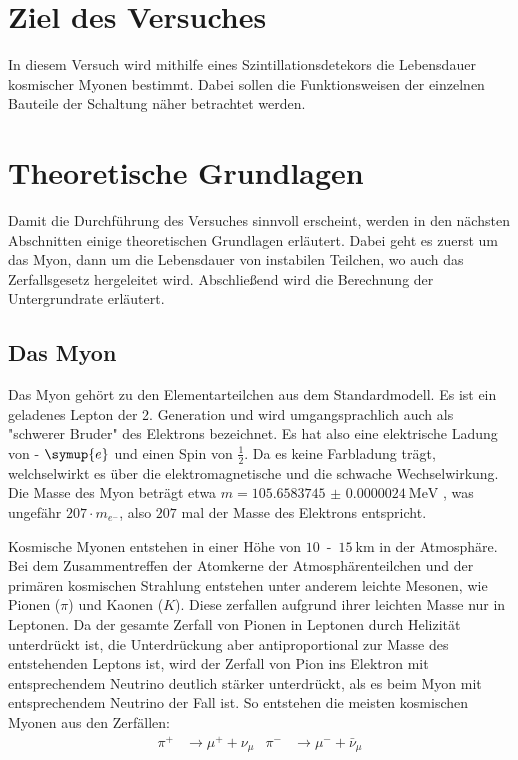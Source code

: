 \section{Ziel des Versuches}
\label{sec:ziel}

    \noindent In diesem Versuch wird mithilfe eines Szintillationsdetekors die Lebensdauer kosmischer Myonen bestimmt. 
    Dabei sollen die Funktionsweisen der einzelnen Bauteile der Schaltung näher betrachtet werden. 

\section{Theoretische Grundlagen}
\label{sec:Theorie}

    \noindent Damit die Durchführung des Versuches sinnvoll erscheint, werden in den nächsten Abschnitten einige theoretischen Grundlagen erläutert. 
    Dabei geht es zuerst um das Myon, dann um die Lebensdauer von instabilen Teilchen, wo auch das Zerfallsgesetz hergeleitet wird. Abschließend 
    wird die Berechnung der Untergrundrate erläutert. 

    \subsection{Das Myon}

        \noindent Das Myon gehört zu den Elementarteilchen aus dem Standardmodell. Es ist ein geladenes Lepton der 2. Generation und wird umgangsprachlich 
        auch als "schwerer Bruder" des Elektrons bezeichnet. Es hat also eine elektrische Ladung von - $\symup{e}$ und einen Spin von $\frac{1}{2}$. Da es keine 
        Farbladung trägt, welchselwirkt es über die elektromagnetische und die schwache Wechselwirkung. Die Masse des Myon beträgt etwa $m = \SI{105.6583745(24)}{\mega\electronvolt}$ 
        \cite{pdg}, was ungefähr $207 \cdot m_{e^-}$, also $207$ mal der Masse des Elektrons entspricht.   

        \noindent Kosmische Myonen entstehen in einer Höhe von $\num{10}$\, -\, $\SI{15}{\kilo\metre}$ in der Atmosphäre. Bei dem Zusammentreffen der Atomkerne der Atmosphärenteilchen und der primären 
        kosmischen Strahlung entstehen unter anderem leichte Mesonen, wie Pionen ($\pi$) und Kaonen ($K$). Diese zerfallen aufgrund ihrer leichten Masse nur in Leptonen. Da der gesamte 
        Zerfall von Pionen in Leptonen durch Helizität unterdrückt ist, die Unterdrückung aber antiproportional zur Masse des entstehenden Leptons ist, wird der Zerfall von Pion ins 
        Elektron mit entsprechendem Neutrino deutlich stärker unterdrückt, als es beim Myon mit entsprechendem Neutrino der Fall ist. So entstehen die meisten kosmischen Myonen aus den 
        Zerfällen: 
        \begin{align*}
            \pi^+ &\rightarrow \mu^+ + \nu_{\mu} & \pi^- &\rightarrow \mu^- + \bar{\nu}_{\mu}
        \end{align*}

